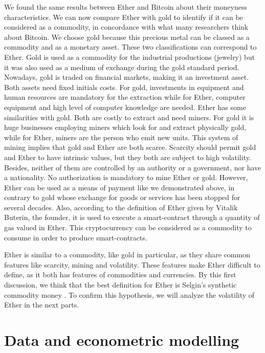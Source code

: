 \documentclass[11pt]{report}
\begin{document}
We found the same results between Ether and Bitcoin about their moneyness characteristics. We can now compare Ether with gold to identify if it can be considered as a commodity, in concordance with what many researchers think about Bitcoin. We choose gold because this precious metal can be classed as a commodity and as a monetary asset. These two classifications can correspond to Ether. Gold is used as a commodity for the industrial productions (jewelry) but it was also used as a medium of exchange during the gold standard period. Nowadays, gold is traded on financial markets, making it an investment asset. Both assets need fixed initials costs. For gold, investments in equipment and human resources are mandatory for the extraction while for Ether, computer equipment and high level of computer knowledge are needed.\newline
Ether has some similarities with gold. Both are costly to extract and need miners. For gold it is huge businesses employing miners which look for and extract physically gold, while for Ether, miners are the person who emit new units. This system of mining implies that gold and Ether are both scarce.  Scarcity should permit gold and Ether to have intrinsic values, but they both are subject to high volatility. Besides, neither of them are controlled by an authority or a government, nor have a nationality. No authorization is mandatory to mine Ether or gold. \newline 
However, Ether can be used as a means of payment like we demonstrated above, in contrary to gold whose exchange for goods or services has been stopped for several decades. Also, according to the definition of Ether given by Vitalik Buterin, the founder, it is used to execute a smart-contract through a quantity of gas valued in Ether. This cryptocurrency can be considered as a commodity to consume in order to produce smart-contracts. \smallbreak

Ether is similar to a commodity, like gold in particular, as they share common features like scarcity, mining and volatility. These features make Ether difficult to define, as it both has features of commodities and currencies. By this first discussion, we think that the best definition for Ether is Selgin’s synthetic commodity money \cite{SELGIN}. To confirm this hypothesis, we will analyze the volatility of Ether in the next parts.    
\clearpage	
	\section{Data and econometric modelling}
\end{document}
